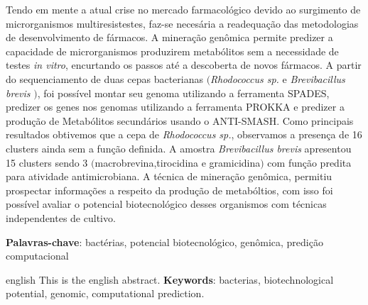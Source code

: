 \setlength{\absparsep}{18pt} %
\begin{resumo}

Tendo em mente a atual crise no mercado farmacológico devido ao surgimento de microrganismos
multiresistestes, faz-se necesária a readequação das metodologias de desenvolvimento de fármacos.
A mineração genômica permite predizer a capacidade de microrganismos produzirem
metabólitos sem a necessidade de testes \textit{in vitro}, encurtando os passos
até a descoberta de novos fármacos. A partir do sequenciamento de duas cepas
bacterianas $($\textit{Rhodococcus sp.} e \textit{Brevibacillus brevis} $)$, foi 
possível montar seu genoma utilizando a ferramenta SPADES, predizer os genes nos
genomas utilizando a ferramenta PROKKA e predizer a produção de Metabólitos 
secundários usando o ANTI-SMASH.  Como principais resultados obtivemos que a cepa
de \textit{Rhodococcus sp.}, observamos a presença de 16 clusters ainda sem a função definida.
A amostra \textit{Brevibacillus brevis} apresentou 15 clusters sendo 3 $($macrobrevina,tirocidina e gramicidina$)$ com função predita
para atividade antimicrobiana. A técnica de mineração genômica, permitiu prospectar informações
a respeito da produção de metabóltios, com isso foi possível avaliar o potencial biotecnológico
desses organismos com técnicas independentes de cultivo.

\vspace{\onelineskip}
\noindent 
\textbf{Palavras-chave}: bactérias, potencial biotecnológico, genômica, predição computacional

\end{resumo}

\begin{resumo}[Abstract]
 \begin{otherlanguage*}{english}
   This is the english abstract.
   \vspace{\onelineskip}
   \noindent 
   \textbf{Keywords}: bacterias, biotechnological potential, genomic, computational prediction.
 \end{otherlanguage*}
\end{resumo}

% 

%  
